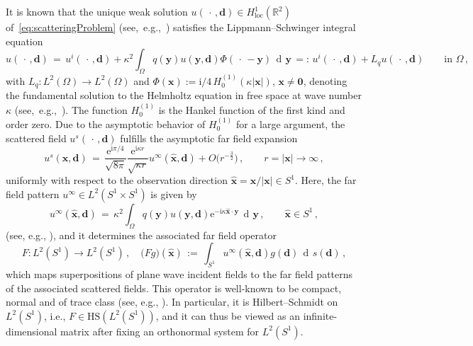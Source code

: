 \documentclass[11pt,a4paper]{article}
\theoremstyle{definition}
\theoremstyle{remark} \newtheorem{remark}[theorem]{Remark}
\numberwithin{equation}{section}
\numberwithin{figure}{section}
\numberwithin{algorithm}{section}
\numberwithin{table}{section}
\newcommand{\field}[1]{{\mathbb{#1}}}
\newcommand{\R}{\field{R}}
\newcommand{\bs}{\boldsymbol}
\newcommand{\bfd}{{\bs d}}
\newcommand{\bfx}{{\bs x}}
\newcommand{\bfy}{{\bs y}}
\newcommand{\bfzero}{{\bs 0}}
\newcommand{\xhat}{\widehat{\bfx}}
\newcommand{\HS}{\mathrm{HS}}
\newcommand{\loc}{{\mathrm{loc}}}
\newcommand{\ra}{\rightarrow}
\newcommand{\ds}{\, \dif s}
\newcommand{\dy}{\, \dif \bfy}
\newcommand{\idir}{\bfd}
\newcommand{\rmi}{\mathrm{i}}
\newcommand{\rme}{\mathrm{e}}
\newcommand{\ph}{\,\cdot\,}
\newcommand{\uinfty}{u^\infty}
\newcommand{\Sone}{{S^1}}
\newcommand{\Sd}{{S^1}}
\newcommand{\Rd}{{\R^2}}
\newcommand{\ui}{u^i}
\newcommand{\us}{u^s}
\newcommand{\Ltwo}{{L^2}}
\DeclareMathOperator{\dif}{d\!}
\begin{document}
It is known that the unique weak solution $u(\ph,\idir)\in H^1_{\loc}(\Rd)$ of~\eqref{eq:scatteringProblem} (see,~e.g.,~\cite[Thm.~7.13]{Kir21}) satisfies the Lippmann--Schwinger integral equation
\begin{equation}
  \label{eq:LippmannSchwinger}
  u(\ph,\idir) 
  \,=\, \ui(\ph,\idir)
  + \kappa^2 \int_\Omega q(\bfy)u(\bfy,\idir) \Phi(\ph-\bfy)  \dy
  \,=:\, \ui(\ph,\idir)
  + L_q u(\ph,\idir)
  \qquad \text{in } \Omega \,,
\end{equation}
with $L_q:\Ltwo(\Omega)\rightarrow\Ltwo(\Omega)$ and $\Phi(\bfx):=\rmi/4\, H^{(1)}_0(\kappa|\bfx|)$, $\bfx\not=\bfzero$, denoting
the fundamental solution to the Helmholtz equation in free space at wave number $\kappa$ (see,~e.g.,~\cite[Thm.~7.12]{Kir21}). 
The function $H^{(1)}_0$ is the Hankel function of the first kind and order zero. Due to the asymptotic behavior of $H^{(1)}_0$ for a large argument, the scattered field $u^s(\ph,\idir)$ fulfills the asymptotic far field expansion
\begin{equation}
\label{eq:far_field_expansion}
  \us(\bfx,\idir) \,=\, \frac{\rme^{\rmi\pi/4}}{\sqrt{8\pi}}
  \frac{\rme^{\rmi \kappa r}}{\sqrt{\kappa r}} 
  \uinfty(\xhat,\idir) + O\bigl(r^{-\frac{3}{2}}\bigr) \,, \qquad 
  r=|\bfx| \to \infty \,,
\end{equation}
uniformly with respect to the observation direction $\xhat=\bfx/|\bfx|\in\Sd$. Here, the far field pattern ${\uinfty \in \Ltwo(\Sd\times\Sd)}$ is given by
\begin{equation}
\label{eq:full_far_field}
  \uinfty(\xhat,\idir) 
  \,=\, \kappa^2 \int_\Omega q(\bfy) u(\bfy,\idir) \rme^{-\rmi \kappa \xhat\cdot \bfy} \dy \,, 
  \qquad \xhat\in\Sd \,,
\end{equation}
(see, e.g., \cite[Thm.~7.15]{Kir21}), and it determines 
the associated far field operator
\begin{equation}
  \label{eq:FarfieldOperator}
  F: \Ltwo(\Sd) \ra \Ltwo(\Sd) \,, \quad
  \bigl(Fg\bigr)(\xhat)
  \,:=\, \int_{\Sd} \uinfty(\xhat,\idir) g(\idir)\ds(\idir)\,,
\end{equation}
which maps superpositions of plane wave incident fields to the far field patterns of the associated scattered fields.
This operator is well-known to be compact, normal and of trace class (see, e.g., \cite{ColKre95b}). In particular, it is Hilbert--Schmidt on $\Ltwo(\Sone)$, i.e., $F \in \HS(\Ltwo(\Sone))$, and it can thus be viewed as an infinite-dimensional matrix after fixing an orthonormal system for $\Ltwo(\Sone)$.
\end{document}
